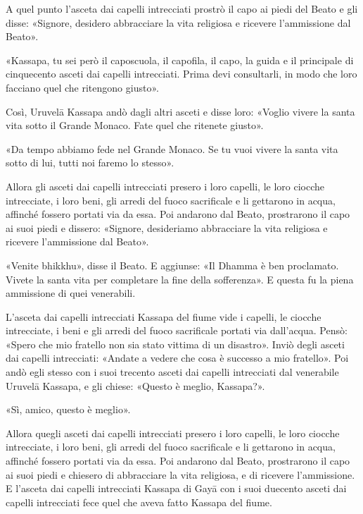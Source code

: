 A quel punto l’asceta dai capelli intrecciati prostrò il capo ai piedi del Beato
e gli disse: «Signore, desidero abbracciare la vita religiosa e ricevere
l’ammissione dal Beato».

«Kassapa, tu sei però il caposcuola, il capofila, il capo, la guida e il
principale di cinquecento asceti dai capelli intrecciati. Prima devi
consultarli, in modo che loro facciano quel che ritengono giusto».

Così, Uruvelā Kassapa andò dagli altri asceti e disse loro: «Voglio vivere la
santa vita sotto il Grande Monaco. Fate quel che ritenete giusto».

«Da tempo abbiamo fede nel Grande Monaco. Se tu vuoi vivere la santa vita sotto
di lui, tutti noi faremo lo stesso».

Allora gli asceti dai capelli intrecciati presero i loro capelli, le loro
ciocche intrecciate, i loro beni, gli arredi del fuoco sacrificale e li
gettarono in acqua, affinché fossero portati via da essa. Poi andarono dal
Beato, prostrarono il capo ai suoi piedi e dissero: «Signore, desideriamo
abbracciare la vita religiosa e ricevere l’ammissione dal Beato».

«Venite bhikkhu», disse il Beato. E aggiunse: «Il Dhamma è ben proclamato.
Vivete la santa vita per completare la fine della sofferenza». E questa fu la
piena ammissione di quei venerabili.

L’asceta dai capelli intrecciati Kassapa del fiume vide i capelli, le ciocche
intrecciate, i beni e gli arredi del fuoco sacrificale portati via dall’acqua.
Pensò: «Spero che mio fratello non sia stato vittima di un disastro». Inviò
degli asceti dai capelli intrecciati: «Andate a vedere che cosa è successo a mio
fratello». Poi andò egli stesso con i suoi trecento asceti dai capelli
intrecciati dal venerabile Uruvelā Kassapa, e gli chiese: «Questo è meglio,
Kassapa?».

«Sì, amico, questo è meglio».

Allora quegli asceti dai capelli intrecciati presero i loro capelli, le loro
ciocche intrecciate, i loro beni, gli arredi del fuoco sacrificale e li
gettarono in acqua, affinché fossero portati via da essa. Poi andarono dal
Beato, prostrarono il capo ai suoi piedi e chiesero di abbracciare la vita
religiosa, e di ricevere l’ammissione. E l’asceta dai capelli intrecciati
Kassapa di Gayā con i suoi duecento asceti dai capelli intrecciati fece quel che
aveva fatto Kassapa del fiume.


